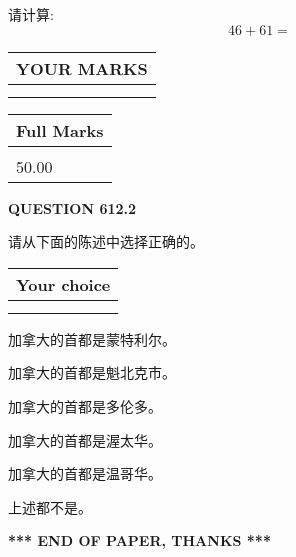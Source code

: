 \documentclass{ctexart}
\begin{document}
  
 
请计算:
\begin{equation}
46 +  %
61 = \nonumber
\end{equation}
 

 

 
  
\vspace{0.2in}
  
\noindent\begin{tabular}{|l|}
\hline
 YOUR MARKS  \\
\hline
 \\ 
 \\ 
\hline
\end{tabular}
\hspace{0.05in} \begin{tabular}{|l|}
\hline
 Full Marks  \\
\hline
 \\ 
50.00 \\
\hline
\end{tabular}
{\textbf{\Large{QUESTION
612.2 
}}}
  
  
请从下面的陈述中选择正确的。
  
  
\noindent\hspace{3.0in} \begin{tabular}{|l|}
\hline
Your choice \\
\hline
 \\ 
 \\ 
\hline
\end{tabular}
  
  
 
 
加拿大的首都是蒙特利尔。
 
 
加拿大的首都是魁北克市。
 
 
加拿大的首都是多伦多。
 
 
加拿大的首都是渥太华。
 
 
加拿大的首都是温哥华。
 
 
 上述都不是。
 
 
   
   
 \vspace{0.2in}
 
   
   
   
   
\vspace{1.0in} 
{\textbf{\large{ *** END OF PAPER, THANKS *** }}} 
   
\end{document}
